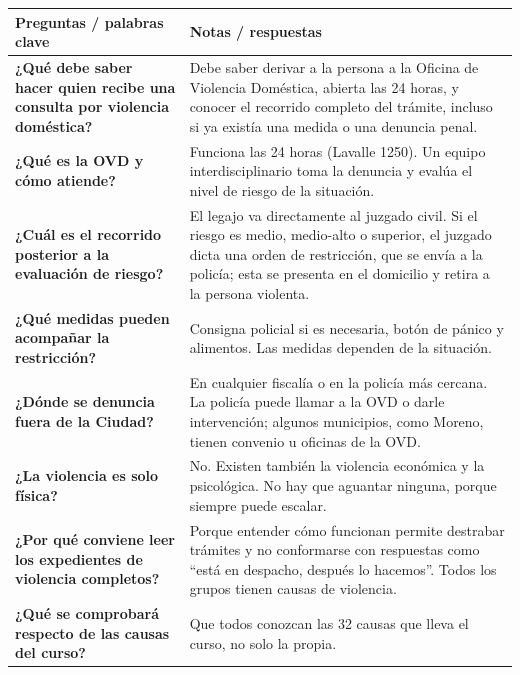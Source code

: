 \documentclass[12pt,oneside]{book}
\begin{document}
\small
\begin{longtable}{
    >{\raggedright\arraybackslash}p{}
    >{\raggedright\arraybackslash}p{}
}
\toprule
\textbf{Preguntas / palabras clave} &
\textbf{Notas / respuestas} \\
\midrule
\endhead

\textbf{¿Qué debe saber hacer quien recibe una consulta por violencia doméstica?} &
Debe saber derivar a la persona a la Oficina de Violencia Doméstica, abierta las 24 horas, y conocer el recorrido completo del trámite, incluso si ya existía una medida o una denuncia penal. \\[0.4em]

\textbf{¿Qué es la OVD y cómo atiende?} &
Funciona las 24 horas (Lavalle 1250). Un equipo interdisciplinario toma la denuncia y evalúa el nivel de riesgo de la situación. \\[0.4em]

\textbf{¿Cuál es el recorrido posterior a la evaluación de riesgo?} &
El legajo va directamente al juzgado civil. Si el riesgo es medio, medio-alto o superior, el juzgado dicta una orden de restricción, que se envía a la policía; esta se presenta en el domicilio y retira a la persona violenta. \\[0.4em]

\textbf{¿Qué medidas pueden acompañar la restricción?} &
Consigna policial si es necesaria, botón de pánico y alimentos. Las medidas dependen de la situación. \\[0.4em]

\textbf{¿Dónde se denuncia fuera de la Ciudad?} &
En cualquier fiscalía o en la policía más cercana. La policía puede llamar a la OVD o darle intervención; algunos municipios, como Moreno, tienen convenio u oficinas de la OVD. \\[0.4em]

\textbf{¿La violencia es solo física?} &
No. Existen también la violencia económica y la psicológica. No hay que aguantar ninguna, porque siempre puede escalar. \\[0.4em]

\textbf{¿Por qué conviene leer los expedientes de violencia completos?} &
Porque entender cómo funcionan permite destrabar trámites y no conformarse con respuestas como ``está en despacho, después lo hacemos''. Todos los grupos tienen causas de violencia. \\[0.4em]

\textbf{¿Qué se comprobará respecto de las causas del curso?} &
Que todos conozcan las 32 causas que lleva el curso, no solo la propia. \\


\end{longtable}
\end{document}
